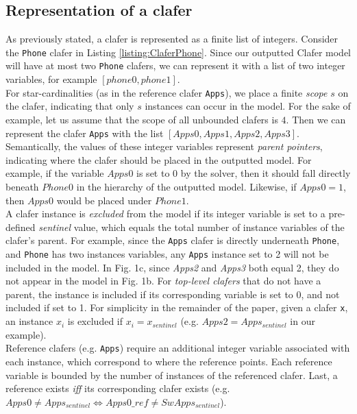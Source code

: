 \documentclass{article}
\begin{document}
\subsection{Representation of a clafer}
As previously stated, a clafer is represented as a finite list of integers. Consider the \texttt{Phone} clafer in Listing \ref{listing:ClaferPhone}. Since our outputted Clafer model will have at most two \texttt{Phone} clafers, we can represent it with a list of two integer variables, for example $[phone0, phone1]$.  \\
\indent For star-cardinalities (as in the reference clafer \texttt{Apps}), we place a finite \textit{scope} $s$ on the clafer, indicating that only $s$ instances can occur in the model. For the sake of example, let us assume that the scope of all unbounded clafers is $4$. Then we can represent the clafer \texttt{Apps} with the list $[Apps0, Apps1, Apps2, Apps3]$.\\
\indent Semantically, the values of these integer variables represent \textit{parent pointers}, indicating where the clafer should be placed in the outputted model. For example, if the variable $Apps0$ is set to $0$ by the solver, then it should fall directly beneath $Phone0$ in the hierarchy of the outputted model. Likewise, if $Apps0 = 1$, then $Apps0$ would be placed under $Phone1$.\\
\indent A clafer instance is \textit{excluded} from the model if its integer variable is set to a pre-defined \textit{sentinel} value, which equals the total number of instance variables of the clafer's parent. For example, since the \texttt{Apps} clafer is directly underneath \texttt{Phone}, and \texttt{Phone} has two instances variables, any \texttt{Apps} instance set to 2 will not be included in the model. In Fig. 1c, since \textit{Apps2} and \textit{Apps3} both equal 2, they do not appear in the model in Fig. 1b. For \textit{top-level clafers} that do not have a parent, the instance is included if its corresponding variable is set to 0, and not included if set to 1. For simplicity in the remainder of the paper, given a clafer \texttt{x}, an instance \textit{$x_i$} is excluded if  $x_i = x_{sentinel}$ (e.g. $Apps2 = Apps_{sentinel}$ in our example). \\
\indent Reference clafers (e.g. \texttt{Apps}) require an additional integer variable associated with each instance, which correspond to where the reference points. Each reference variable is bounded by the number of instances of the referenced clafer. Last, a reference exists \textit{iff} its corresponding clafer exists (e.g. $Apps0 \ne Apps_{sentinel} \Leftrightarrow Apps0\_ref \ne SwApps_{sentinel}$).
\end{document}
